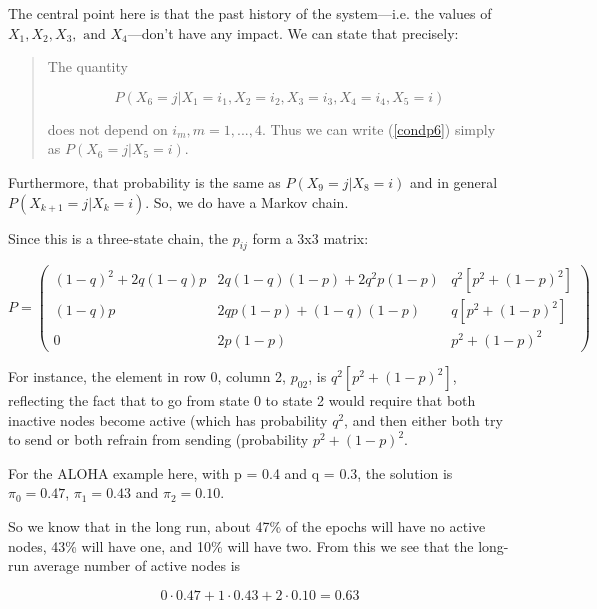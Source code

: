 The central point here is that the past history of the system---i.e. the
values of $X_1, X_2, X_3, \textrm{ and } X_4$---don't have any impact.
We can state that precisely:

\begin{quote}

The quantity

\begin{equation}
\label{condp6}
P(X_6 = j | X_1 = i_1, X_2 = i_2, X_3 = i_3, X_4 = i_4, X_5 = i)
\end{equation}

\noindent 
does not depend on $i_m, m = 1,...,4$.  Thus we can write (\ref{condp6})
simply as $P(X_6 = j | X_5 = i)$.  

\end{quote}

Furthermore, that probability is the same as $P(X_9 = j | X_8 = i)$ and
in general $P(X_{k+1} = j | X_k = i)$.  So, we do have a Markov chain.

Since this is a three-state chain, the $p_{ij}$ form a 3x3 matrix:

\begin{equation}
P = 
\left (
\begin{array}{ccc}
(1-q)^2 + 2q(1-q)p & 
   2q(1-q)(1-p) + 2q^2p(1-p) & 
   q^2 [p^2+(1-p)^2] \\
(1-q) p & 
   2qp(1-p) + (1-q)(1-p) & 
   q[p^2+(1-p)^2] \\
0 & 
   2p(1-p) & 
   p^2+(1-p)^2
\end{array}
\right )
\end{equation}

For instance, the element in row 0, column 2, $p_{02}$, is
$q^2[p^2+(1-p)^2]$, reflecting the fact that to go from state 0 to state
2 would require that both inactive nodes become active (which has
probability $q^2$, and then either both try to send or both refrain from
sending (probability $p^2+(1-p)^2$.

For the ALOHA example here, with p = 0.4 and q = 0.3, the solution is
$\pi_0 = 0.47$, $\pi_1 = 0.43$ and $\pi_2 = 0.10$.

So we know that in the long run, about 47\% of the epochs will have no
active nodes, 43\% will have one, and 10\% will have two.  From this we
see that the long-run average number of active nodes is

\begin{equation}
0 \cdot 0.47 + 1 \cdot 0.43 + 2 \cdot 0.10 = 0.63
\end{equation}

